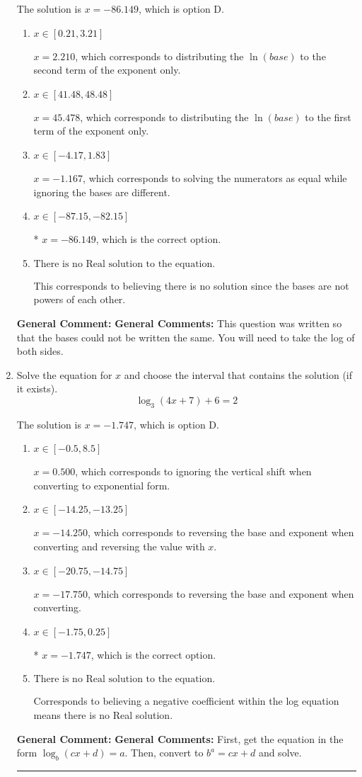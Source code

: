 \documentclass{extbook}[14pt]
\newcommand{\litem}[1]{\item #1

\rule{\textwidth}{0.4pt}}
\begin{document}
\begin{enumerate}
{The solution is \( x = -86.149 \), which is option D.\begin{enumerate}[label=\Alph*.]
\item \( x \in [0.21, 3.21] \)

$x = 2.210$, which corresponds to distributing the $\ln(base)$ to the second term of the exponent only.
\item \( x \in [41.48, 48.48] \)

$x = 45.478$, which corresponds to distributing the $\ln(base)$ to the first term of the exponent only.
\item \( x \in [-4.17, 1.83] \)

$x = -1.167$, which corresponds to solving the numerators as equal while ignoring the bases are different.
\item \( x \in [-87.15, -82.15] \)

* $x = -86.149$, which is the correct option.
\item \( \text{There is no Real solution to the equation.} \)

This corresponds to believing there is no solution since the bases are not powers of each other.
\end{enumerate}

\textbf{General Comment:} \textbf{General Comments:} This question was written so that the bases could not be written the same. You will need to take the log of both sides.
}
\litem{
Solve the equation for $x$ and choose the interval that contains the solution (if it exists).
\[ \log_{3}{(4x+7)}+6 = 2 \]

The solution is \( x = -1.747 \), which is option D.\begin{enumerate}[label=\Alph*.]
\item \( x \in [-0.5, 8.5] \)

$x = 0.500$, which corresponds to ignoring the vertical shift when converting to exponential form.
\item \( x \in [-14.25, -13.25] \)

$x = -14.250$, which corresponds to reversing the base and exponent when converting and reversing the value with $x$.
\item \( x \in [-20.75, -14.75] \)

$x = -17.750$, which corresponds to reversing the base and exponent when converting.
\item \( x \in [-1.75, 0.25] \)

* $x = -1.747$, which is the correct option.
\item \( \text{There is no Real solution to the equation.} \)

Corresponds to believing a negative coefficient within the log equation means there is no Real solution.
\end{enumerate}

\textbf{General Comment:} \textbf{General Comments:} First, get the equation in the form $\log_b{(cx+d)} = a$. Then, convert to $b^a = cx+d$ and solve.
}
\end{enumerate}
\end{document}
